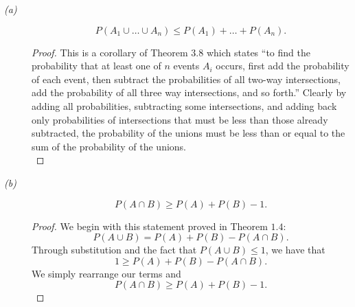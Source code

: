 \documentclass{tufte-handout}
\begin{document}
\begin{description}
\item[\emph{(a)}]
  \[
  P(A_1 \cup \dots \cup A_n) \leq P(A_1) + \dots + P(A_n).
  \]

  \begin{proof} This is a corollary of Theorem $3.8$ which states ``to
    find the probability that at least one of $n$ events $A_i$ occurs,
    first add the probability of each event, then subtract the
    probabilities of all two-way intersections, add the probability of
    all three way intersections, and so forth.'' Clearly by adding all
    probabilities, subtracting some intersections, and adding back
    only probabilities of intersections that must be less than those
    already subtracted, the probability of the unions must be less
    than or equal to the sum
    of the probability of the unions.\\
  \end{proof}

\item[\emph{(b)}]
  \[P(A \cap B) \geq P(A) + P(B) - 1.\]

  \begin{proof}
    We begin with this statement proved in Theorem $1.4$:
    \[P(A \cup B) = P(A) + P(B) - P(A \cap B).\]
    Through substitution and the fact that $P(A \cup B) \leq 1$, we
    have that
    \[1 \geq P(A) + P(B) - P(A \cap B).\]
    We simply rearrange our terms and
    \[P(A \cap B) \geq P(A) + P(B) - 1.\]
  \end{proof}
\end{description}
\end{document}

